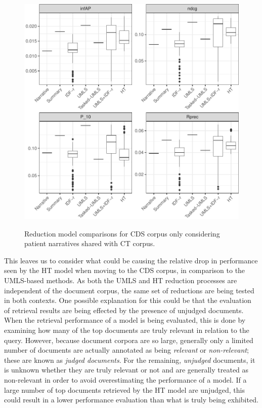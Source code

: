 \documentclass[a4paper]{report}
\begin{document}
\begin{figure}
\centering
\caption{Reduction model comparisons for CDS corpus only considering patient narratives shared with CT corpus.}
\includegraphics[width=.9\columnwidth]{cdsreduction-1415.pdf}
\label{cdsreduction-1415}
\end{figure}

This leaves us to consider what could be causing the relative drop in performance seen by the HT model when moving to the CDS corpus, in comparison to the UMLS-based methods. As both the UMLS and HT reduction processes are independent of the document corpus, the same set of reductions are being tested in both contexts. One possible explanation for this could be that the evaluation of retrieval results are being effected by the presence of unjudged documents. When the retrieval performance of a model is being evaluated, this is done by examining how many of the top documents are truly relevant in relation to the query. However, because document corpora are so large, generally only a limited number of documents are actually annotated as being \textit{relevant} or \textit{non-relevant}; these are known as \textit{judged documents}. For the remaining, \textit{unjudged} documents, it is unknown whether they are truly relevant or not and are generally treated as non-relevant in order to avoid overestimating the performance of a model. If a large number of top documents retrieved by the HT model are unjudged, this could result in a lower performance evaluation than what is truly being exhibited. 
\end{document}
